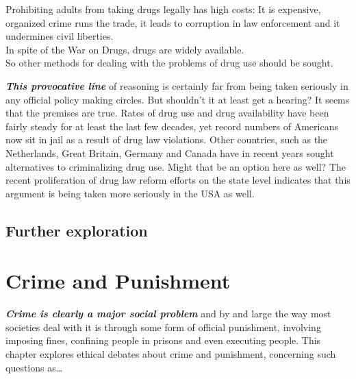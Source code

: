 \documentclass[
  12pt, openany]{book}
\theoremstyle{definition}
\theoremstyle{definition}
\theoremstyle{definition}
\theoremstyle{remark}
\begin{document}
\begin{center}

\begin{argument}

Prohibiting adults from taking drugs legally has high costs: It is expensive, organized crime runs the trade, it leads to corruption in law enforcement and it undermines civil liberties.\\
In spite of the War on Drugs, drugs are widely available.\\

So other methods for dealing with the problems of drug use should be sought.

\end{argument}

\end{center}

\textbf{\emph{This provocative line}} of reasoning is certainly far from being taken seriously in any official policy making circles. But shouldn't it at least get a hearing? It seems that the premises are true. Rates of drug use and drug availability have been fairly steady for at least the last few decades, yet record numbers of Americans now sit in jail as a result of drug law violations. Other countries, such as the Netherlands, Great Britain, Germany and Canada have in recent years sought alternatives to criminalizing drug use. Might that be an option here as well? The recent proliferation of drug law reform efforts on the state level indicates that this argument is being taken more seriously in the USA as well.

\hypertarget{further-exploration-8}{%
\section*{Further exploration}\label{further-exploration-8}}


\hypertarget{crime-and-punishment}{%
\chapter{Crime and Punishment}\label{crime-and-punishment}}

\textbf{\emph{Crime is clearly a major social problem}} and by and large the way most societies deal with it is through some form of official punishment, involving imposing fines, confining people in prisons and even executing people. This chapter explores ethical debates about crime and punishment, concerning such questions as\ldots{}
\end{document}
